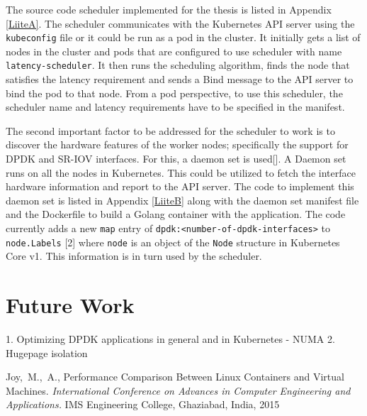 \documentclass[english, 12pt, a4paper, elec, utf8, a-1b, online]{aaltothesis}
\begin{document}
The source code scheduler implemented for the thesis is listed in Appendix \ref{LiiteA}. The scheduler communicates with the Kubernetes API server using the \lstinline{kubeconfig} file or it could be run as a pod in the cluster. It initially gets a list of nodes in the cluster and pods that are configured to use scheduler with name \lstinline{latency-scheduler}. It then runs the scheduling algorithm, finds the node that satisfies the latency requirement and sends a Bind message to the API server to bind the pod to that node. From a pod perspective, to use this scheduler, the scheduler name and latency requirements have to be specified in the manifest.

The second important factor to be addressed for the scheduler to work is to discover the hardware features of the worker nodes; specifically the support for DPDK and SR-IOV interfaces. For this, a daemon set is used[]. A Daemon set runs on all the nodes in Kubernetes. This could be utilized to fetch the interface hardware information and report to the API server. The code to implement this daemon set is listed in Appendix \ref{LiiteB} along with the daemon set manifest file and the Dockerfile to build a Golang container with the application. The code currently adds a new \lstinline{map} entry of \lstinline{dpdk:<number-of-dpdk-interfaces>} to \lstinline{node.Labels} [2] where \lstinline{node} is an object of the \lstinline{Node} structure in Kubernetes Core v1. This information is in turn used by the scheduler.


\clearpage
\section{Future Work}
1. Optimizing DPDK applications in general and in Kubernetes - NUMA
2. Hugepage isolation
\clearpage
\thesisbibliography
\begin{thebibliography}{99}

 Joy,\ M.,\ A., Performance Comparison Between Linux Containers and Virtual Machines. \textit{International Conference on Advances in Computer Engineering and Applications.} IMS Engineering College, Ghaziabad, India, 2015
\end{thebibliography}

\clearpage
\thesisappendix
\end{document}
